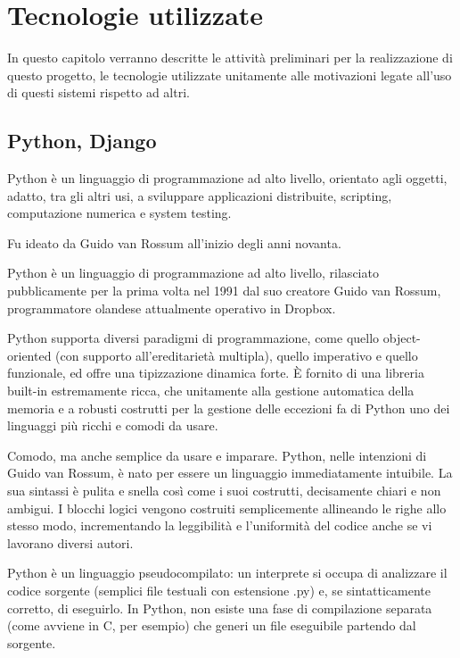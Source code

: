 \chapter{Tecnologie utilizzate}
In questo capitolo verranno descritte le attività preliminari per la realizzazione di questo progetto, le tecnologie utilizzate
unitamente alle motivazioni legate all'uso di questi sistemi rispetto ad altri.


\section{Python, Django}
Python è un linguaggio di programmazione ad alto livello, orientato agli oggetti, adatto, tra gli altri usi, a sviluppare applicazioni 
distribuite, scripting, computazione numerica e system testing.

Fu ideato da Guido van Rossum all'inizio degli anni novanta.

Python è un linguaggio di programmazione ad alto livello, rilasciato pubblicamente per la prima volta nel 1991 dal suo creatore 
Guido van Rossum, programmatore olandese attualmente operativo in Dropbox.

Python supporta diversi paradigmi di programmazione, come quello object-oriented (con supporto all'ereditarietà multipla), quello 
imperativo e quello funzionale, ed offre una tipizzazione dinamica forte. È fornito di una libreria built-in estremamente ricca, che 
unitamente alla gestione automatica della memoria e a robusti costrutti per la gestione delle eccezioni fa di Python uno dei linguaggi 
più ricchi e comodi da usare.

Comodo, ma anche semplice da usare e imparare. Python, nelle intenzioni di Guido van Rossum, è nato per essere un linguaggio 
immediatamente intuibile. La sua sintassi è pulita e snella così come i suoi costrutti, decisamente chiari e non ambigui. I blocchi 
logici vengono costruiti semplicemente allineando le righe allo stesso modo, incrementando la leggibilità e l'uniformità del codice 
anche se vi lavorano diversi autori.

Python è un linguaggio pseudocompilato: un interprete si occupa di analizzare il codice sorgente (semplici file testuali con 
estensione .py) e, se sintatticamente corretto, di eseguirlo. In Python, non esiste una fase di compilazione separata (come 
avviene in C, per esempio) che generi un file eseguibile partendo dal sorgente.

